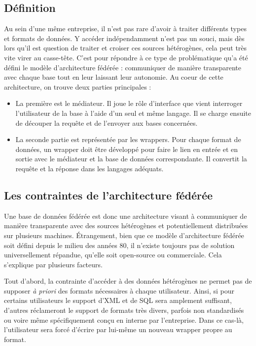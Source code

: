 \documentclass[a4paper,10pt]{article}
\begin{document}
\subsection{Définition}
Au sein d'une même entreprise, il n'est pas rare d'avoir à traiter différents types et formats de données. Y accéder indépendamment n'est pas un souci, mais dès lors qu'il est question de traiter et croiser ces sources hétérogènes, cela peut très vite virer au casse-tête. C'est pour répondre à ce type de problématique qu'a été défini le modèle d'architecture fédérée : communiquer de manière transparente avec chaque base tout en leur laissant leur autonomie. Au coeur de cette architecture, on trouve deux parties principales : 
\begin{itemize}
\item La première est le médiateur. Il joue le rôle d'interface que vient interroger l'utilisateur de la base à l'aide d'un seul et même langage. Il se charge ensuite de découper la requête et de l'envoyer aux bases concernées.
\item La seconde partie est représentée par les wrappers. Pour chaque format de données, un wrapper doit être développé pour faire le lien en entrée et en sortie avec le médiateur et la base de données correspondante. Il convertit la requête et la réponse dans les langages adéquats.
\end{itemize}

\subsection{Les contraintes de l'architecture fédérée}
Une base de données fédérée est donc une architecture visant à communiquer de manière transparente avec des sources hétérogènes et potentiellement distribuées sur plusieurs machines. Étrangement, bien que ce modèle d'architecture fédérée soit défini depuis le milieu des années 80, il n'existe toujours pas de solution universellement répandue, qu'elle soit open-source ou commerciale. Cela s'explique par plusieurs facteurs. 

Tout d'abord, la contrainte d'accéder à des données hétérogènes ne permet pas de supposer \textit{à priori} des formats nécessaires à chaque utilisateur. Ainsi, si pour certains utilisateurs le support d'XML et de SQL sera amplement suffisant, d'autres réclameront le support de formats très divers, parfois non standardisés ou voire même spécifiquement conçu en interne par l'entreprise. Dans ce cas-là, l'utilisateur sera forcé d'écrire par lui-même un nouveau wrapper propre au format.
\end{document}
